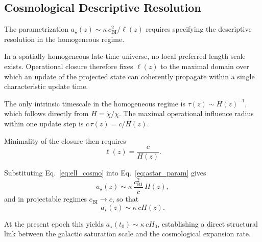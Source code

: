\subsection{Cosmological Descriptive Resolution}
  \label{subsec:cosmo_resolution}

  The parametrization $a_\star(z) \sim \kappa\, c_{\mathrm{BI}}^2 / \ell(z)$
  requires specifying the descriptive resolution in the homogeneous regime.

  In a spatially homogeneous late-time universe, no local preferred length scale exists.
  Operational closure therefore fixes $\ell(z)$ to the maximal domain
  over which an update of the projected state can coherently propagate
  within a single characteristic update time.

  The only intrinsic timescale in the homogeneous regime is $\tau(z) \sim H(z)^{-1}$,
  which follows directly from $H = \dot{\chi}/\chi$.
  The maximal operational influence radius within one update step is $c\,\tau(z) = c/H(z)$.

  Minimality of the closure then requires
  \begin{equation}
   \label{eq:ell_cosmo}
    \ell(z) = \frac{c}{H(z)}.
  \end{equation}

  Substituting Eq.~\eqref{eq:ell_cosmo} into Eq.~\eqref{eq:astar_param} gives
  \begin{equation}
    \label{eq:astar_general}
    a_\star(z) \sim \kappa\, \frac{c_{\mathrm{BI}}^2}{c}\, H(z),
  \end{equation}
  and in projectable regimes $c_{\mathrm{BI}} \to c$, so that
  \begin{equation}
    \label{eq:astar_projectable}
    a_\star(z) \sim \kappa\, c H(z).
  \end{equation}

  At the present epoch this yields $a_\star(t_0) \sim \kappa\, c H_0$,
  establishing a direct structural link between the galactic
  saturation scale and the cosmological expansion rate.
